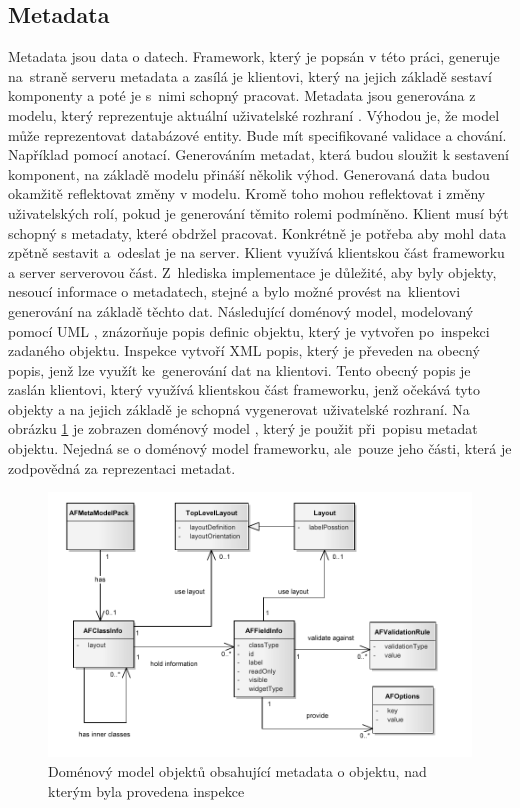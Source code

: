 \subsection{Metadata}
Metadata \cite{metadata} jsou data o datech. Framework, který je popsán v této práci, generuje na~straně serveru metadata a zasílá je klientovi, který na jejich základě sestaví komponenty a poté je s~nimi schopný pracovat. Metadata jsou generována z modelu, který reprezentuje aktuální uživatelské rozhraní \cite{cernyuml}. Výhodou je, že model může reprezentovat databázové entity. Bude mít specifikované validace a chování. Například pomocí anotací. Generováním metadat, která budou sloužit k sestavení komponent, na základě modelu přináší několik výhod. Generovaná data budou okamžitě reflektovat změny v modelu. Kromě toho mohou reflektovat i změny uživatelských rolí, pokud je generování těmito rolemi podmíněno. 
Klient musí být schopný s metadaty, které obdržel pracovat. Konkrétně je potřeba aby mohl data zpětně sestavit a~odeslat je na server. Klient využívá klientskou část frameworku a server serverovou část. Z~hlediska implementace je důležité, aby byly objekty, nesoucí informace o metadatech, stejné a bylo možné provést na~klientovi generování na základě těchto dat.
Následující doménový model, modelovaný pomocí UML \cite{UmlArlow}, znázorňuje popis definic objektu, který je vytvořen po~inspekci zadaného objektu. Inspekce vytvoří XML popis, který je převeden na obecný popis, jenž lze využít ke~generování dat na klientovi. Tento obecný popis je zaslán klientovi, který využívá klientskou část frameworku, jenž očekává tyto objekty a na jejich základě je schopná vygenerovat uživatelské rozhraní. Na obrázku \ref{img:metadataModel} je zobrazen doménový model \cite{UmlArlow}, který je použit při~popisu metadat objektu. Nejedná se o doménový model frameworku, ale~pouze jeho části, která je zodpovědná za reprezentaci metadat. 

\begin{figure}[h!]
\includegraphics{images/domainModel}
\caption{Doménový model objektů obsahující metadata o objektu, nad kterým byla provedena inspekce}
\label{img:metadataModel}
\end{figure}

